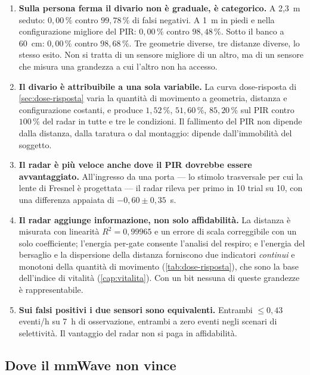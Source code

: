 \begin{enumerate}[leftmargin=1.8em,itemsep=3pt]
  \item \textbf{Sulla persona ferma il divario non è graduale, è categorico.} A 2,3~m
        seduto: $0{,}00\,\%$ contro $99{,}78\,\%$ di falsi negativi. A 1~m in piedi e
        nella configurazione migliore del PIR: $0{,}00\,\%$ contro $98{,}48\,\%$.
        Sotto il banco a 60~cm: $0{,}00\,\%$ contro $98{,}68\,\%$. Tre geometrie
        diverse, tre distanze diverse, lo stesso esito. Non si tratta di un sensore
        migliore di un altro, ma di un sensore che misura una grandezza a cui l'altro
        non ha accesso.
  \item \textbf{Il divario è attribuibile a una sola variabile.} La curva
        dose-risposta di \cref{sec:dose-risposta} varia la quantità di movimento a
        geometria, distanza e configurazione costanti, e produce $1{,}52\,\%$,
        $51{,}60\,\%$, $85{,}20\,\%$ sul PIR contro $100\,\%$ del radar in tutte e tre
        le condizioni. Il fallimento del PIR non dipende dalla distanza, dalla
        taratura o dal montaggio: dipende dall'immobilità del soggetto.
  \item \textbf{Il radar è più veloce anche dove il PIR dovrebbe essere avvantaggiato.}
        All'ingresso da una porta --- lo stimolo trasversale per cui la lente di
        Fresnel è progettata --- il radar rileva per primo in 10 trial su 10, con una
        differenza appaiata di $-0{,}60 \pm 0{,}35$~s.
  \item \textbf{Il radar aggiunge informazione, non solo affidabilità.} La distanza è
        misurata con linearità $R^2 = 0{,}99965$ e un errore di scala correggibile con
        un solo coefficiente; l'energia per-gate consente l'analisi del respiro; e
        l'energia del bersaglio e la dispersione della distanza forniscono due
        indicatori \emph{continui} e monotoni della quantità di movimento
        (\cref{tab:dose-risposta}), che sono la base dell'indice di vitalità
        (\cref{cap:vitalita}). Con un bit nessuna di queste grandezze è
        rappresentabile.
  \item \textbf{Sui falsi positivi i due sensori sono equivalenti.} Entrambi
        $\leq 0{,}43$ eventi/h su 7~h di osservazione, entrambi a zero eventi negli
        scenari di selettività. Il vantaggio del radar non si paga in affidabilità.
\end{enumerate}

\subsection{Dove il mmWave non vince}

